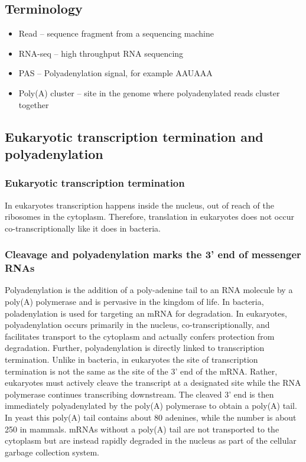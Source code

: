 %


\subsection{Terminology}
\begin{itemize}
	\item Read -- sequence fragment from a sequencing machine
	\item RNA-seq -- high throughput RNA sequencing
	\item PAS -- Polyadenylation signal, for example AAUAAA
	\item Poly(A) cluster -- site in the genome where polyadenylated reads
		cluster together
\end{itemize}

\subsection{Eukaryotic transcription termination and polyadenylation}

\subsubsection{Eukaryotic transcription termination}
In eukaryotes transcription happens inside the nucleus, out of reach of
the ribosomes in the cytoplasm. Therefore, translation in eukaryotes does not
occur co-transcriptionally like it does in bacteria.

\subsubsection{Cleavage and polyadenylation marks the 3' end of messenger RNAs}
Polyadenylation is the addition of a poly-adenine tail to an RNA molecule by a
poly(A) polymerase and is pervasive in the kingdom of life. In bacteria,
poladenylation is used for targeting an mRNA for degradation. In eukaryotes,
polyadenylation occurs primarily in the nucleus, co-transcriptionally, and
facilitates transport to the cytoplasm and actually confers protection from
degradation. Further, polyadenylation is directly linked to transcription
termination. Unlike in bacteria, in eukaryotes the site of transcription
termination is not the same as the site of the 3' end of the mRNA. Rather,
eukaryotes must actively cleave the transcript at a designated site while the
RNA polymerase continues transcribing downstream. The cleaved 3' end is then
immediately polyadenylated by the poly(A) polymerase to obtain a poly(A) tail.
In yeast this poly(A) tail contains about 80 adenines, while the number is
about 250 in mammals. mRNAs without a poly(A) tail are not transported to the
cytoplasm but are instead rapidly degraded in the nucleus as part of the
cellular garbage collection system.

